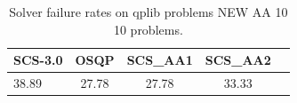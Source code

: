 \begin{table}
\centering
\caption{Solver failure rates on qplib problems NEW AA 10 10 problems.}
\label{t-qplib problems NEW AA 10 10-failure}
\begin{tabular}{lcccc}
\toprule
 SCS-3.0 &  OSQP &  SCS\_AA1 &  SCS\_AA2 \\
\midrule
   38.89 & 27.78 &    27.78 &    33.33 \\
\bottomrule
\end{tabular}
\end{table}
